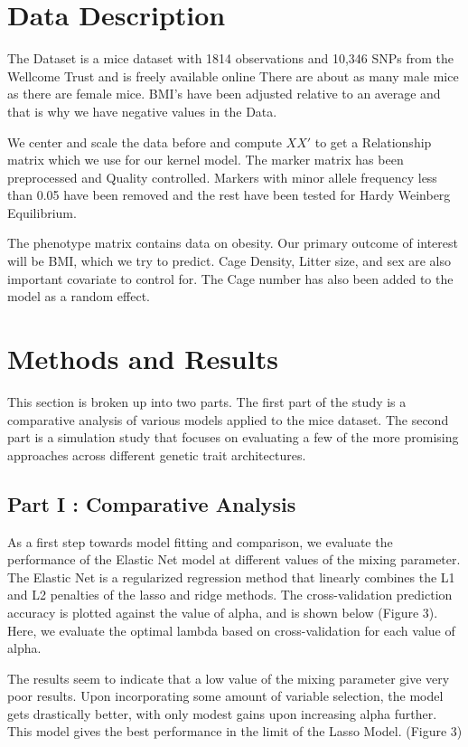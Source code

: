 \documentclass{sig-alternate-05-2015}
\begin{document}
\section{Data Description}

The Dataset is a mice dataset with 1814 observations and 10,346 SNPs from the Wellcome Trust and is freely available online
There are about as many male mice as there are female mice. BMI's have been adjusted relative to an average and that is why we have negative
values in the Data.

We center and scale the data before and compute $XX'$ to get a Relationship matrix which we use for our kernel model.
The marker matrix has been preprocessed and Quality controlled. Markers with minor allele frequency less than 0.05 have been removed and the rest have been tested for Hardy Weinberg Equilibrium.

The phenotype matrix contains data on obesity. Our primary outcome of interest will be BMI, which we try to predict.
Cage Density, Litter size, and sex are also important covariate to control for. The Cage number has also been added to the model as a random effect.


\section{Methods and Results}

This section is broken up into two parts. The first part of the study is a comparative analysis of various models applied to the mice dataset.
The second part is a simulation study that focuses on evaluating a few of the more promising approaches across different genetic trait architectures.

\subsection{Part I : Comparative Analysis}

As a first step towards model fitting and comparison, we evaluate the performance of the Elastic Net model at different values of the mixing parameter.
The Elastic Net is a regularized regression method that
linearly combines the L1 and L2 penalties of the lasso and ridge methods.\cite{_elastic_2017}
The cross-validation prediction accuracy is plotted against the value of alpha, and is shown below (Figure 3).  Here, we evaluate the optimal lambda based on cross-validation
for each value of alpha.

The results seem to indicate that a low value of the mixing parameter give very poor results. Upon incorporating some amount of variable selection, the model gets
drastically better, with only modest gains upon increasing alpha further. This model gives the best performance in the limit of the Lasso Model.
(Figure 3)
\end{document}

